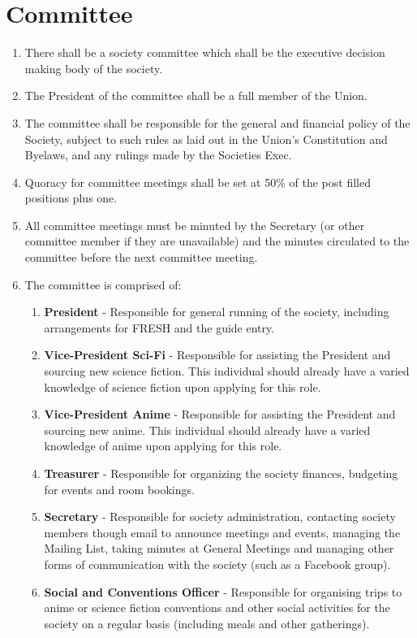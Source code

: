 \documentclass[a4paper,10pt]{article}
\begin{document}
\section{Committee}
\begin{enumerate}
  \item There shall be a society committee which shall be the executive decision making body of the society.
  \item The President of the committee shall be a full member of the Union.
  \item The committee shall be responsible for the general and financial policy of the Society, subject to such rules as laid out in the Union's Constitution and Byelaws, and any rulings made by the Societies Exec.
  \item Quoracy for committee meetings shall be set at 50\% of the post filled positions plus one.
  \item All committee meetings must be minuted by the Secretary (or other committee member if they are unavailable) and the minutes circulated to the committee before the next committee meeting.
  \item The committee is comprised of:
  \begin{enumerate}
    \item \textbf{President} - Responsible for general running of the society, including arrangements for FRESH and the guide entry.
    \item \textbf{Vice-President Sci-Fi} - Responsible for assisting the President and sourcing new science fiction. This individual should already have a varied knowledge of science fiction upon applying for this role.
    \item \textbf{Vice-President Anime} - Responsible for assisting the President and sourcing new anime. This individual should already have a varied knowledge of anime upon applying for this role.
    \item \textbf{Treasurer} - Responsible for organizing the society finances, budgeting for events and room bookings.
    \item \textbf{Secretary} - Responsible for society administration, contacting society members though email to announce meetings and events, managing the Mailing List, taking minutes at General Meetings and managing other forms of communication with the society (such as a Facebook group).
    \item \textbf{Social and Conventions Officer} - Responsible for organising trips to anime or science fiction conventions and other social activities for the society on a regular basis (including meals and other gatherings).
  \end{enumerate}
\end{enumerate}
\end{document}
